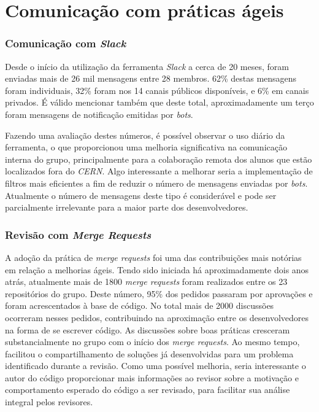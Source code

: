 \hypertarget{praticas-ageis}{%
\section{Comunicação com práticas ágeis}\label{praticas-ageis}}

\hypertarget{comunicacao-com-slack}{%
\subsubsection{\texorpdfstring{Comunicação com \emph{Slack}}{Comunicação com Slack}}\label{comunicacao-com-slack}}

Desde o início da utilização da ferramenta \emph{Slack} a cerca de 20 meses, foram enviadas mais de 26 mil mensagens entre 28 membros. 62\% destas mensagens foram individuais, 32\% foram nos 14 canais públicos disponíveis, e 6\% em canais privados. É válido mencionar também que deste total, aproximadamente um terço foram mensagens de notificação emitidas por \emph{bots}.

Fazendo uma avaliação destes números, é possível observar o uso diário da ferramenta, o que proporcionou uma melhoria significativa na comunicação interna do grupo, principalmente para a colaboração remota dos alunos que estão localizados fora do \emph{CERN}. Algo interessante a melhorar seria a implementação de filtros mais eficientes a fim de reduzir o número de mensagens enviadas por \emph{bots}. Atualmente o número de mensagens deste tipo é considerável e pode ser parcialmente irrelevante para a maior parte dos desenvolvedores.

\hypertarget{revisao-com-merge-requests}{%
\subsubsection{\texorpdfstring{Revisão com \emph{Merge Requests}}{Revisão com Merge Requests}}\label{revisao-com-merge-requests}}

A adoção da prática de \emph{merge requests} foi uma das contribuições mais notórias em relação a melhorias ágeis. Tendo sido iniciada há aproximadamente dois anos atrás, atualmente mais de 1800 \emph{merge requests} foram realizados entre os 23 repositórios do grupo. Deste número, 95\% dos pedidos passaram por aprovações e foram acrescentados à base de código. No total mais de 2000 discussões ocorreram nesses pedidos, contribuindo na aproximação entre os desenvolvedores na forma de se escrever código. As discussões sobre boas práticas cresceram substancialmente no grupo com o início dos \emph{merge requests}. Ao mesmo tempo, facilitou o compartilhamento de soluções já desenvolvidas para um problema identificado durante a revisão. Como uma possível melhoria, seria interessante o autor do código proporcionar mais informações ao revisor sobre a motivação e comportamento esperado do código a ser revisado, para facilitar sua análise integral pelos revisores.

